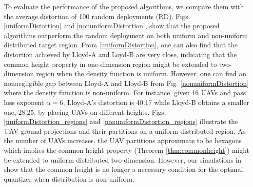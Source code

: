 \documentclass[smallabstract,smallcaptions]{dccpaper}
\begin{document}
To evaluate the performance of the proposed algorithms, we compare them with the average distortion of 100 random
deployments (RD).  Figs. \ref{uniformDistortion} and \ref{nonuniformDistortion}, show that the proposed algorithms
outperform the random deployment on both uniform and non-uniform distributed target region.  From
\ref{uniformDistortion}, one can also find that the distortion achieved by Lloyd-A and Loyd-B are very close, indicating
that the common height property in one-dimension region might be extended to two-dimension region when the density
function is uniform.  However, one can find an nonnegligible gap between Lloyd-A and Lloyd-B from Fig.
\ref{nonuniformDistortion} where the density function is non-uniform. For instance, given 16 UAVs and pass loss exponent
$\alpha=6$, Lloyd-A's distortion is 40.17 while Lloyd-B obtains a smaller one, 28.25, by placing UAVs on different
heights.  Figs. \ref{uniformDistortion_regions} and \ref{nonuniformDistortion_regions} illustrate the UAV ground
projections and their partitions on a uniform distributed region. As the number of UAVs increases, the UAV partitions
approximate to be hexagons which implies the common height property (Theorem \ref{thm:commonheight}) might be extended
to uniform distributed two-dimension.  However, our simulations in \cite{GWJ18b} show that the common height is no
longer a necessary condition for the optimal quantizer when distribution is non-uniform.
%
\end{document}
